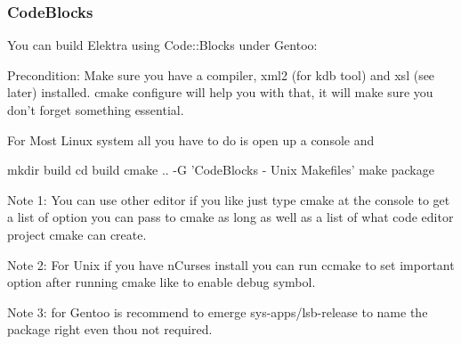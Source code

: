 \subsubsection*{Code\+Blocks}

You can build Elektra using Code\+::\+Blocks under Gentoo\+:

Precondition\+: Make sure you have a compiler, xml2 (for kdb tool) and xsl (see later) installed. cmake configure will help you with that, it will make sure you don't forget something essential.

For Most Linux system all you have to do is open up a console and \begin{DoxyVerb}    mkdir build
    cd build
    cmake .. -G 'CodeBlocks - Unix Makefiles'
    make package
\end{DoxyVerb}


Note 1\+: You can use other editor if you like just type cmake at the console to get a list of option you can pass to cmake as long as well as a list of what code editor project cmake can create.

Note 2\+: For Unix if you have n\+Curses install you can run ccmake to set important option after running cmake like to enable debug symbol.

Note 3\+: for Gentoo is recommend to emerge sys-\/apps/lsb-\/release to name the package right even thou not required. 